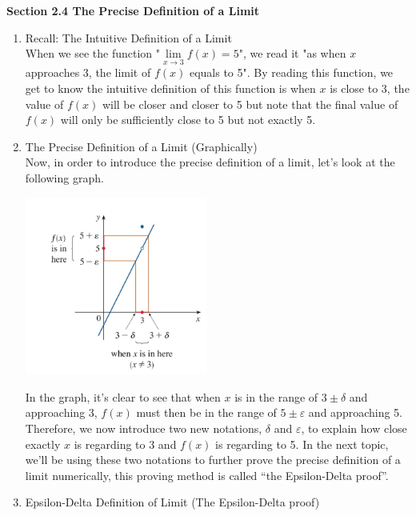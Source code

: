 \documentclass[12px]{article}
\begin{document}
\begin{center}
    \huge\textbf {Section 2.4 The Precise Definition of a Limit}
\end{center}
\large\begin{enumerate}
    \item Recall: The Intuitive Definition of a Limit\\
    \hspace*{2em}When we see the function "$\lim\limits_{x \to 3}f(x)=5 $", we read it "as when $x$ approaches 3, the limit of $f(x)$ equals to 5". By reading this function, we get to know the intuitive
    definition of this function is when $x$ is close to 3, the value of $f(x)$ will be closer and closer to 5 but note that the final value of $f(x)$ will only be sufficiently close to 5 but not exactly 5.
    \\
    \item The Precise Definition of a Limit (Graphically)\\
    \hspace*{2em}Now, in order to introduce the precise definition of a limit, let’s look at the following graph.
    \begin{center}
        \includegraphics[width=6cm]{pic1.jpg}
    \end{center}
    \hspace*{2em}In the graph, it’s clear to see that when $x$ is in the range of $3\pm\delta$ and approaching 3, $f(x)$ must then be in the range of $5\pm\varepsilon$ and approaching 5. Therefore, we now introduce two new notations, $\delta$ and $\varepsilon$, to explain how close exactly $x$ is regarding to 3 and $f(x)$ is regarding to 5. In the next topic, we’ll be using these two notations to further prove the precise definition of a limit numerically, this proving method is called “the Epsilon-Delta proof”.
    \\
    \item Epsilon-Delta Definition of Limit (The Epsilon-Delta proof)\\

\end{enumerate}
\end{document}
